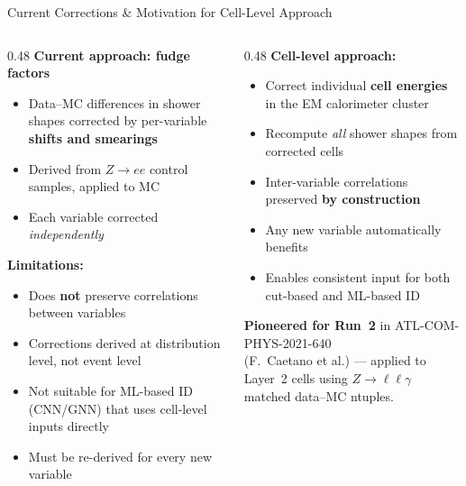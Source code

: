 \documentclass[aspectratio=169,10pt]{beamer}
\begin{document}
\begin{frame}{Current Corrections \& Motivation for Cell-Level Approach}

\begin{columns}[T]
\begin{column}{0.48\textwidth}
  \textbf{Current approach: fudge factors}
  \begin{itemize}
    \item Data--MC differences in shower shapes corrected by
          per-variable \textbf{shifts and smearings}
    \item Derived from $Z\to ee$ control samples, applied to MC
    \item Each variable corrected \emph{independently}
  \end{itemize}
  \vspace{4pt}
  \textbf{Limitations:}
  \begin{itemize}
    \item Does \textbf{not} preserve correlations between variables
    \item Corrections derived at distribution level, not event level
    \item Not suitable for ML-based ID (CNN/GNN) that uses
          cell-level inputs directly
    \item Must be re-derived for every new variable
  \end{itemize}
\end{column}
\begin{column}{0.48\textwidth}
  \textbf{Cell-level approach:}
  \begin{itemize}
    \item Correct individual \textbf{cell energies} in the EM
          calorimeter cluster
    \item Recompute \emph{all} shower shapes from corrected cells
    \item Inter-variable correlations preserved
          \textbf{by construction}
    \item Any new variable automatically benefits
    \item Enables consistent input for both cut-based and ML-based ID
  \end{itemize}
  \vspace{4pt}
  \textbf{Pioneered for Run~2} in ATL-COM-PHYS-2021-640\\
  (F.~Caetano et al.) — applied to Layer~2 cells using
  $Z\to\ell\ell\gamma$ matched data--MC ntuples.
\end{column}
\end{columns}
\end{frame}
\end{document}
